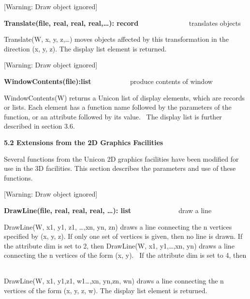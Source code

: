 \documentclass[letterpaper]{article}
\begin{document}
[Warning: Draw object ignored]

{
\textsf{\textbf{Translate(file, real, real, real,{\dots}): record}}\textbf{ \ \ }\ \ \ \ \ \  \ \ \ \ \ \ translates
objects}


\bigskip

{
\textsf{Translate(W, x, y, z,{\dots})} moves objects affected by this transformation in the direction (x, y, z). The
display list element is returned.}

[Warning: Draw object ignored]

{
\textsf{\textbf{WindowContents(file):list\ \ \ \ \ \ \ \ \ \  }}produce contents of window}


\bigskip

{
\textsf{WindowContents(W)} returns a Unicon list of display elements, which are records or lists. Each element has a
function name followed by the parameters of the function, or an attribute followed by its value. \ The display list is
further described in section 3.6. }


\bigskip


\bigskip

{\bfseries
5.2 Extensions from the 2D Graphics Facilities}


\bigskip

{
Several functions from the Unicon 2D graphics facilities have been modified for use in the 3D facilities. This section
describes the parameters and use of these functions.}


\bigskip


\bigskip

[Warning: Draw object ignored]

{
\textsf{\textbf{DrawLine(file, real, real, real, {\dots}): list}}\ \ \ \ \ \ \ \ \ \  \ \ \ \ draw a line}


\bigskip

{
\textsf{DrawLine(W, x1, y1, z1, {\dots},xn, yn, zn)} draws a line connecting the n vertices specified by (x, y, z). If
only one set of vertices is given, then no line is drawn. If the attribute \textsf{dim} is set to 2, then
\textsf{DrawLine(W, x1, y1,{\dots},xn, yn) }draws a line connecting the n vertices of the form (x, y). \ If the
attribute \textsf{dim} is set to 4, then \ }

{
\textsf{DrawLine(W, x1, y1,z1, w1{\dots},xn, yn,zn, wn) }draws a line connecting the n vertices of the form (x, y, z,
w). The display list element is returned.}
\end{document}
